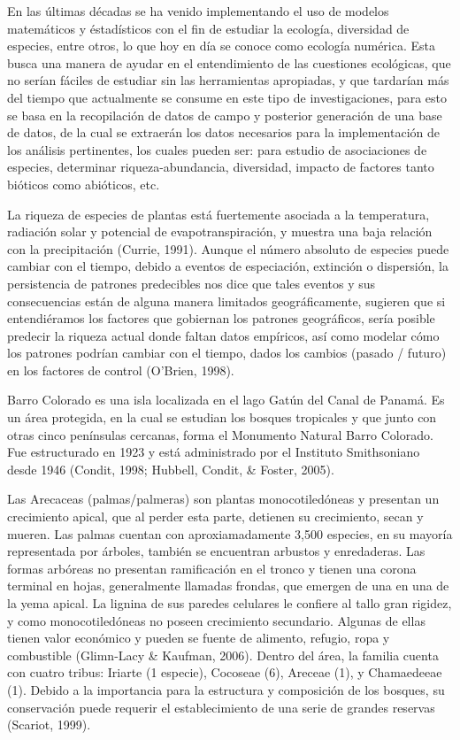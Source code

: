 \documentclass[11pt,]{article}
\begin{document}
En las últimas décadas se ha venido implementando el uso de modelos
matemáticos y éstadísticos con el fin de estudiar la ecología,
diversidad de especies, entre otros, lo que hoy en día se conoce como
ecología numérica. Esta busca una manera de ayudar en el entendimiento
de las cuestiones ecológicas, que no serían fáciles de estudiar sin las
herramientas apropiadas, y que tardarían más del tiempo que actualmente
se consume en este tipo de investigaciones, para esto se basa en la
recopilación de datos de campo y posterior generación de una base de
datos, de la cual se extraerán los datos necesarios para la
implementación de los análisis pertinentes, los cuales pueden ser: para
estudio de asociaciones de especies, determinar riqueza-abundancia,
diversidad, impacto de factores tanto bióticos como abióticos, etc.

La riqueza de especies de plantas está fuertemente asociada a la
temperatura, radiación solar y potencial de evapotranspiración, y
muestra una baja relación con la precipitación (Currie, 1991). Aunque el
número absoluto de especies puede cambiar con el tiempo, debido a
eventos de especiación, extinción o dispersión, la persistencia de
patrones predecibles nos dice que tales eventos y sus consecuencias
están de alguna manera limitados geográficamente, sugieren que si
entendiéramos los factores que gobiernan los patrones geográficos, sería
posible predecir la riqueza actual donde faltan datos empíricos, así
como modelar cómo los patrones podrían cambiar con el tiempo, dados los
cambios (pasado / futuro) en los factores de control (O'Brien, 1998).

Barro Colorado es una isla localizada en el lago Gatún del Canal de
Panamá. Es un área protegida, en la cual se estudian los bosques
tropicales y que junto con otras cinco penínsulas cercanas, forma el
Monumento Natural Barro Colorado. Fue estructurado en 1923 y está
administrado por el Instituto Smithsoniano desde 1946 (Condit, 1998;
Hubbell, Condit, \& Foster, 2005).

Las Arecaceas (palmas/palmeras) son plantas monocotiledóneas y presentan
un crecimiento apical, que al perder esta parte, detienen su
crecimiento, secan y mueren. Las palmas cuentan con aproxiamadamente
3,500 especies, en su mayoría representada por árboles, también se
encuentran arbustos y enredaderas. Las formas arbóreas no presentan
ramificación en el tronco y tienen una corona terminal en hojas,
generalmente llamadas frondas, que emergen de una en una de la yema
apical. La lignina de sus paredes celulares le confiere al tallo gran
rigidez, y como monocotiledóneas no poseen crecimiento secundario.
Algunas de ellas tienen valor económico y pueden se fuente de alimento,
refugio, ropa y combustible (Glimn-Lacy \& Kaufman, 2006). Dentro del
área, la familia cuenta con cuatro tribus: Iriarte (1 especie), Cocoseae
(6), Areceae (1), y Chamaedeeae (1). Debido a la importancia para la
estructura y composición de los bosques, su conservación puede requerir
el establecimiento de una serie de grandes reservas (Scariot, 1999).
\end{document}
